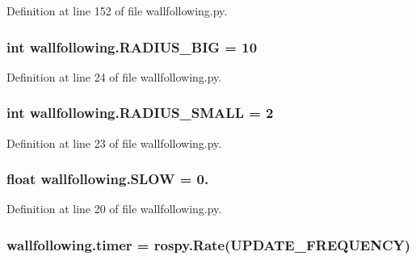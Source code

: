 Definition at line 152 of file wallfollowing.\+py.

\subsubsection[{\texorpdfstring{R\+A\+D\+I\+U\+S\+\_\+\+B\+IG}{RADIUS_BIG}}]{\setlength{\rightskip}{0pt plus 5cm}int wallfollowing.\+R\+A\+D\+I\+U\+S\+\_\+\+B\+IG = 10}\hypertarget{namespacewallfollowing_a4b502375f79f9fcc2a823cc60da7bee0}{}\label{namespacewallfollowing_a4b502375f79f9fcc2a823cc60da7bee0}


Definition at line 24 of file wallfollowing.\+py.

\subsubsection[{\texorpdfstring{R\+A\+D\+I\+U\+S\+\_\+\+S\+M\+A\+LL}{RADIUS_SMALL}}]{\setlength{\rightskip}{0pt plus 5cm}int wallfollowing.\+R\+A\+D\+I\+U\+S\+\_\+\+S\+M\+A\+LL = 2}\hypertarget{namespacewallfollowing_aa59c6dfd10cb4f1550367b3268417436}{}\label{namespacewallfollowing_aa59c6dfd10cb4f1550367b3268417436}


Definition at line 23 of file wallfollowing.\+py.

\subsubsection[{\texorpdfstring{S\+L\+OW}{SLOW}}]{\setlength{\rightskip}{0pt plus 5cm}float wallfollowing.\+S\+L\+OW = 0.}\hypertarget{namespacewallfollowing_a30a4013dbd3a6ea5275fbed3fe35da22}{}\label{namespacewallfollowing_a30a4013dbd3a6ea5275fbed3fe35da22}


Definition at line 20 of file wallfollowing.\+py.

\subsubsection[{\texorpdfstring{timer}{timer}}]{\setlength{\rightskip}{0pt plus 5cm}wallfollowing.\+timer = rospy.\+Rate({\bf U\+P\+D\+A\+T\+E\+\_\+\+F\+R\+E\+Q\+U\+E\+N\+CY})}\hypertarget{namespacewallfollowing_a57288dd797e0bd15012f3ebf1670ce38}{}\label{namespacewallfollowing_a57288dd797e0bd15012f3ebf1670ce38}


